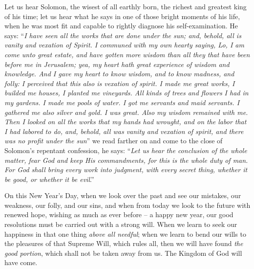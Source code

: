 Let us hear Solomon, the wisest of all earthly 
born, the richest and greatest king of his time; 
let us hear what he says in one of those bright 
moments of his life, when he was most fit and 
capable to rightly diagnose his self-examination. 
He says: ``\textit{I have seen all the works that are 
done under the sun; and, behold, all is vanity 
and vexation of Spirit. I communed with my 
own hearty saying, Lo, I am come unto great 
estate, and have gotten more wisdom than all 
they that have been before me in Jerusalem; 
yea, my heart hath great experience of wisdom 
and knowledge. And I gave my heart to know 
wisdom, and to know madness, and folly: I perceived
that this also is vexation of spirit. I 
made me great works, I builded me houses, I 
planted me vineyards. All kinds of trees and 
flowers I had in my gardens. I made me pools 
of water. I got me servants and maid servants. 
I gathered me also silver and gold. I was 
great. Also my wisdom remained with me. 
Then I looked on all the works that my hands 
had wrought, and on the labor that I had 
labored to do, and, behold, all was vanity and 
vexation of spirit, and there was no profit 
under the sun}'' we read farther 
on and come to the close of Solomon's repentant
confession, he says: ``\textit{Let us hear the conclusion
of the whole matter, fear God and keep 
His commandments, for this is the whole duty 
of man. For God shall bring every work into 
judgment, with every secret thing, whether it be 
good, or whether it be evil}.'' 

On this New Year's Day, when we look over 
the past and see our mistakes, our weakness, 
our folly, and our sins, and when from today 
we look to the future with renewed hope, wishing
as much as ever before -- a happy new 
year, our good resolutions must be carried out 
with a strong will. When we learn to seek our
happiness in that one thing \textit{above all needful}; 
when we learn to bend our wills to the pleasures 
of that Supreme Will, which rules all, then we 
will have found \textit{the good portion}, which shall 
not be taken away from us. The Kingdom of 
God will have come. 

